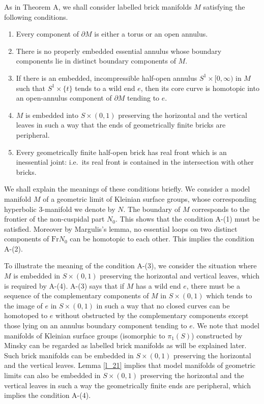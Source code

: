 \documentclass{amsart}
\theoremstyle{definition}
\numberwithin{figure}{section}
\numberwithin{equation}{section}
\newcommand{\ie}{i.e.\ }
\newcommand{\Fr}{\mathrm{Fr}}
\begin{document}
As in Theorem A, we shall consider  labelled brick manifolds $M$ satisfying the following conditions.
\begin{enumerate}[{A}-(1)]
\item Every component of $\partial M$ is either a torus or an open annulus.
\item
There is no properly embedded essential annulus whose boundary components lie in distinct boundary components of $M$.
\item
If there is an embedded, incompressible half-open annulus $S^1 \times [0,\infty)$ in $M$ such that $S^1 \times \{t\}$ tends to a wild end $e$, then its core curve is homotopic into an open-annulus component of $\partial M$ tending to $e$.
\item $M$ is embedded into $S \times (0,1)$ preserving the horizontal and the vertical leaves in such a way that the ends of geometrically finite bricks are peripheral.
\item
Every geometrically finite half-open brick has real front which is an inessential joint: \ie its real front is contained in the intersection with other bricks.

\end{enumerate}

We shall explain the meanings of  these conditions briefly.
We consider a model manifold $M$ of a geometric limit of Kleinian surface groups, whose corresponding hyperbolic 3-manifold we denote by $N$.
The boundary of $M$ corresponds to the frontier of the non-cuspidal part $N_0$.
This shows that the condition A-(1) must be satisfied.
Moreover by Margulis's lemma, no essential loops on two distinct components of $\Fr N_0$ can be homotopic to each other.
This implies the condition A-(2).

To illustrate the meaning of the condition A-(3), we consider the situation where $M$ is embedded in $S \times (0,1)$ preserving the horizontal and vertical leaves, which is required by A-(4).
A-(3) says that if $M$ has a wild end $e$, there must be a sequence of the complementary components of $M$ in $S \times (0,1)$ which tends to the image of $e$ in $S \times (0,1)$ in such a way that no closed curves can be homotoped to $e$ without obstructed by the complementary components except those lying on an annulus boundary component tending to $e$.
We note that model manifolds of  Kleinian surface groups (isomorphic to $\pi_1(S)$) constructed by Minsky can be regarded as labelled brick manifolds as will be explained later.
Such brick manifolds can be embedded in $S \times (0,1)$ preserving the horizontal and the vertical leaves.
Lemma \ref{l_21} implies that  model manifolds of geometric limits can also be embedded in $S \times (0,1)$ preserving the horizontal and the vertical leaves in such a way the geometrically finite ends are peripheral, which implies the condition A-(4).
\end{document}
